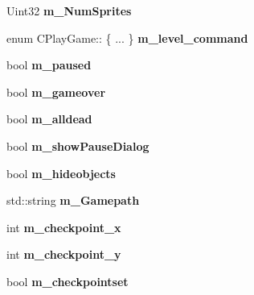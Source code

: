 \begin{DoxyCompactItemize}
\item 
\hypertarget{class_c_play_game_aca6294627653deef3cdbceec5a9cf0ed}{
Uint32 {\bfseries m\_\-NumSprites}}
\label{class_c_play_game_aca6294627653deef3cdbceec5a9cf0ed}

\item 
\hypertarget{class_c_play_game_ae9de98e62478d1136f27c1980257aa16}{
enum CPlayGame:: \{ ... \}  {\bfseries m\_\-level\_\-command}}
\label{class_c_play_game_ae9de98e62478d1136f27c1980257aa16}

\item 
\hypertarget{class_c_play_game_ad67032692ee7a7352be712aec07e5d63}{
bool {\bfseries m\_\-paused}}
\label{class_c_play_game_ad67032692ee7a7352be712aec07e5d63}

\item 
\hypertarget{class_c_play_game_a577e4896e07367f0c0e71561f7a8ba09}{
bool {\bfseries m\_\-gameover}}
\label{class_c_play_game_a577e4896e07367f0c0e71561f7a8ba09}

\item 
\hypertarget{class_c_play_game_ac096d06c6dcde1966094ad221d751443}{
bool {\bfseries m\_\-alldead}}
\label{class_c_play_game_ac096d06c6dcde1966094ad221d751443}

\item 
\hypertarget{class_c_play_game_a999fb76004f04e34da058df5aab18a28}{
bool {\bfseries m\_\-showPauseDialog}}
\label{class_c_play_game_a999fb76004f04e34da058df5aab18a28}

\item 
\hypertarget{class_c_play_game_a32f2950c1f92ed11438070c77d24c33e}{
bool {\bfseries m\_\-hideobjects}}
\label{class_c_play_game_a32f2950c1f92ed11438070c77d24c33e}

\item 
\hypertarget{class_c_play_game_a95bbdfea178eccbe626fede9049ce397}{
std::string {\bfseries m\_\-Gamepath}}
\label{class_c_play_game_a95bbdfea178eccbe626fede9049ce397}

\item 
\hypertarget{class_c_play_game_acd559b42768809bd92ce84e50bac25e9}{
int {\bfseries m\_\-checkpoint\_\-x}}
\label{class_c_play_game_acd559b42768809bd92ce84e50bac25e9}

\item 
\hypertarget{class_c_play_game_a70c9c0d61aec3890927f9184f35a37f6}{
int {\bfseries m\_\-checkpoint\_\-y}}
\label{class_c_play_game_a70c9c0d61aec3890927f9184f35a37f6}

\item 
\hypertarget{class_c_play_game_a8d2086d85b2cb045a76d65ecea8dee9f}{
bool {\bfseries m\_\-checkpointset}}
\label{class_c_play_game_a8d2086d85b2cb045a76d65ecea8dee9f}


\end{DoxyCompactItemize}
